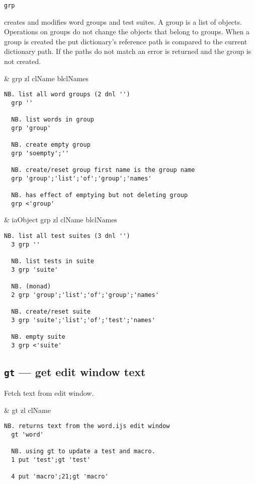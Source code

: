 \hypertarget{il:grp}{\texttt{grp}} creates and modifies word groups
 and test suites. A group is a list of objects. Operations on groups do not change 
 the objects that belong to groups. When a group is created the
 put dictionary's reference path is compared to the current dictionary path. 
 If the paths do not match an error is returned and the group is not created. 

\begin{wordhead}
\monad & grp zl \argsep clName \argsep blclNames \\
\end{wordhead}
\begin{lstlisting}[frame=single,framerule=0pt] 
  NB. list all word groups (2 dnl '')
  grp ''    
  
  NB. list words in group    
  grp 'group'  
  
  NB. create empty group 
  grp 'soempty';''

  NB. create/reset group first name is the group name
  grp 'group';'list';'of';'group';'names'

  NB. has effect of emptying but not deleting group 
  grp <'group' 
\end{lstlisting}

\begin{wordhead}
\dyad & iaObject grp zl \argsep clName \argsep blclNames \\
\end{wordhead}
\begin{lstlisting}[frame=single,framerule=0pt] 
  NB. list all test suites (3 dnl '')
  3 grp ''  
  
  NB. list tests in suite   
  3 grp 'suite' 
  
  NB. (monad)
  2 grp 'group';'list';'of';'group';'names'  
  
  NB. create/reset suite
  3 grp 'suite';'list';'of';'test';'names'  
  
  NB. empty suite  
  3 grp <'suite' 
\end{lstlisting}


\subsection{\texttt{gt} --- get edit window text} 

Fetch text from edit window.

\begin{wordhead}
\monad & gt zl \argsep clName \\
\end{wordhead}
\begin{lstlisting}[frame=single,framerule=0pt] 
  NB. returns text from the word.ijs edit window
  gt 'word'  

  NB. using gt to update a test and macro.
  1 put 'test';gt 'test' 

  4 put 'macro';21;gt 'macro' 
\end{lstlisting}


